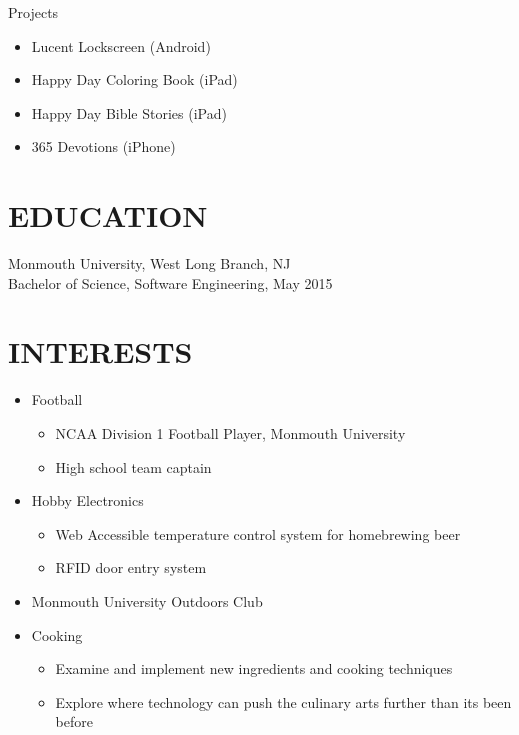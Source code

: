 \documentclass{res}
\begin{document}
\begin{resume}
    Projects
    \begin{itemize}
        \item Lucent Lockscreen (Android)
        \item Happy Day Coloring Book (iPad)
        \item Happy Day Bible Stories (iPad)
        \item 365 Devotions (iPhone)
    \end{itemize}


\section{EDUCATION}          
    Monmouth University, West Long Branch, NJ  \\        
    Bachelor of Science, Software Engineering, May 2015   \\       


\section{INTERESTS}          
    \begin{itemize}
        \item Football
            \begin{itemize}
                \item NCAA Division 1 Football Player, Monmouth University
                \item High school team captain
            \end{itemize}
        \item Hobby Electronics
            \begin{itemize}
                \item Web Accessible temperature control system for homebrewing beer
                \item RFID door entry system
            \end{itemize}
        \item Monmouth University Outdoors Club
        \item Cooking
          \begin{itemize}
            \item Examine and implement new ingredients and cooking techniques
            \item Explore where technology can push the culinary arts further than its been before
          \end{itemize}
    \end{itemize}
 


\end{resume}
\end{document}
